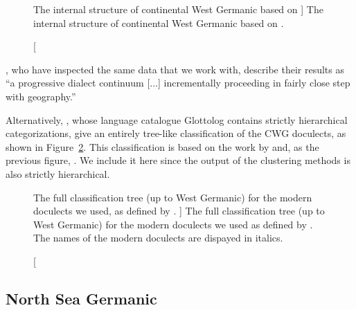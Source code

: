\documentclass[a4paper]{article}
\begin{document}
\begin{figure}[H]
\centering

\caption
[The internal structure of continental West Germanic
based on \citet{harbert2007germanic}]
{The internal structure of continental West Germanic
based on \citet[p. 8]{harbert2007germanic}.}
\label{fig:cwg_harbert}
\end{figure}

\citet{heggarty2010splits}, who have inspected the same data
that we work with, describe their results as
``a progressive dialect continuum [...] incrementally proceeding in fairly close step
with geography.''

Alternatively, \citet{hammarstroem2018glottolog},
whose language catalogue Glottolog contains strictly hierarchical categorizations,
give an entirely tree-like classification of the CWG doculects,
as shown in Figure~\ref{fig:glottolog}.
This classification is based on the work by \citet{stiles2013pan-west}
and, as the previous figure, \citet{harbert2007germanic}.
We include it here since the output of the clustering methods
is also strictly hierarchical.

\begin{figure}[H]
\begin{adjustwidth}{-10cm}{-10cm}
\centering
\scalebox{0.8}{

}
\end{adjustwidth}
% 
\caption
[
The full classification tree (up to West Germanic) for the modern doculects we used,
as defined by \citet{hammarstroem2018glottolog}.
]
{
The full classification tree (up to West Germanic) for the modern doculects we used
as defined by \citet{hammarstroem2018glottolog}.
The names of the modern doculects are dispayed in italics.
}
\label{fig:glottolog}
\end{figure}

\subsection{North Sea Germanic}
\end{document}
